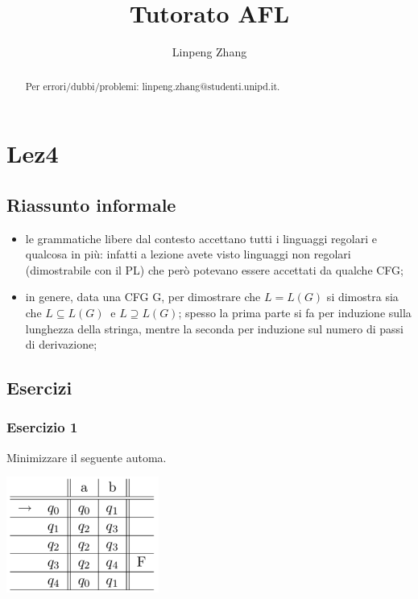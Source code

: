 \documentclass[a4paper,11pt]{article}
\begin{document}
\author{Linpeng Zhang}
\title{Tutorato AFL}
\maketitle
\begin{abstract}
    Per errori/dubbi/problemi: linpeng.zhang@studenti.unipd.it.%
\end{abstract}
\tableofcontents
\section{Lez4}
\subsection{Riassunto informale}
\begin{itemize}
    \item le grammatiche libere dal contesto accettano tutti i linguaggi regolari e qualcosa in più: infatti a lezione avete visto linguaggi non regolari (dimostrabile con il PL) che però potevano essere accettati da qualche CFG;
    \item in genere, data una CFG G, per dimostrare che $L=L(G)$ si dimostra sia che $L\subseteq L(G) \:$ e $L\supseteq L(G)$; spesso la prima parte si fa per induzione sulla lunghezza della stringa, mentre la seconda per induzione sul numero di passi di derivazione;
\end{itemize}
\subsection{Esercizi}
\subsubsection{Esercizio 1}
Minimizzare il seguente automa.
\begin{minipage}{\linewidth}
    \centering
    \includegraphics[width=5cm]{Lez4min.png}
\end{minipage}
\end{document}
